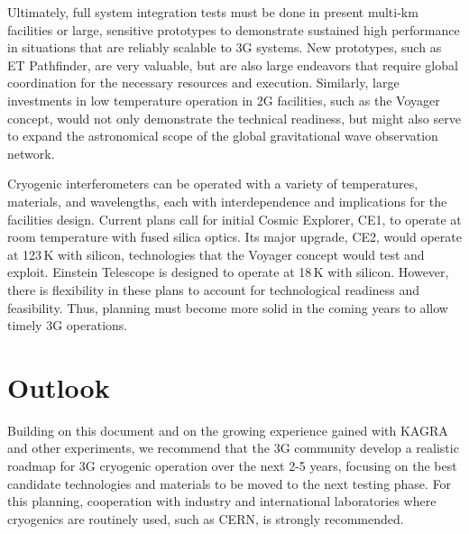 Ultimately, full system integration tests must be done in present multi-km facilities or large, sensitive prototypes to demonstrate sustained high performance in situations that are reliably scalable to 3G systems. New prototypes, such as ET Pathfinder, are very valuable, but are also large endeavors that require global coordination for the necessary resources and execution. Similarly, large investments in low temperature operation in 2G facilities, such as the Voyager concept, would not only demonstrate the technical readiness, but might also serve to expand the astronomical scope of the global gravitational wave observation network. 



Cryogenic interferometers can be operated with a variety of temperatures, materials, and wavelengths, each with interdependence and implications for the facilities design. Current plans call for initial Cosmic Explorer, CE1, to operate at room temperature with fused silica optics. Its major upgrade, CE2, would operate at 123\,K with silicon, technologies that the Voyager concept would test and exploit. Einstein Telescope is designed to operate at 18\,K with silicon. However, there is flexibility in these plans to account for technological readiness and feasibility. Thus, planning must become more solid in the coming years to allow timely 3G operations. 

\section{Outlook}
Building on this document and on the growing experience gained with KAGRA and other experiments, we recommend that the 3G community develop a realistic roadmap for 3G cryogenic operation over the next 2-5 years, focusing on the best candidate technologies and materials to be moved to the next testing phase. For this planning, cooperation with industry and international laboratories where cryogenics are routinely used, such as CERN, is strongly recommended.

